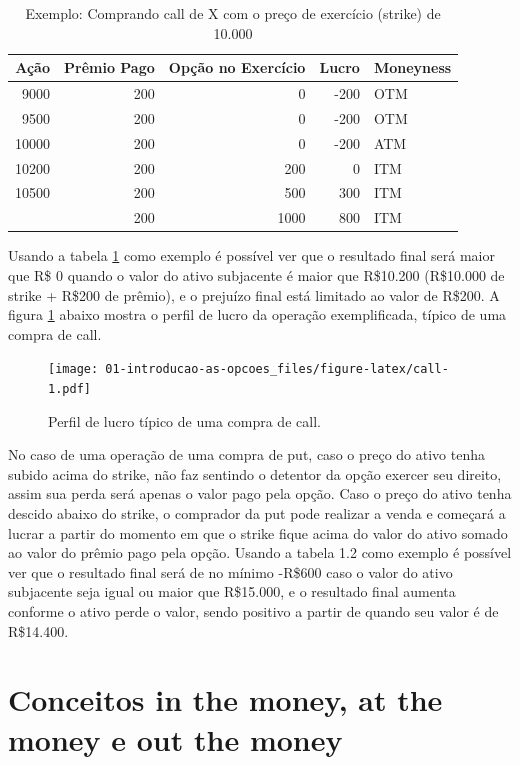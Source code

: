 \documentclass[]{book}
\theoremstyle{definition}
\theoremstyle{definition}
\theoremstyle{definition}
\theoremstyle{remark}
\begin{document}
\begin{table}[t]

\caption{\label{tab:opcao}Exemplo: Comprando call de X com o preço de exercício (strike) de 10.000}
\centering
\begin{tabular}{rrrrl}
\toprule
Ação & Prêmio Pago & Opção no Exercício & Lucro & Moneyness\\
\midrule
9000 & 200 & 0 & -200 & OTM\\
9500 & 200 & 0 & -200 & OTM\\
10000 & 200 & 0 & -200 & ATM\\
10200 & 200 & 200 & 0 & ITM\\
10500 & 200 & 500 & 300 & ITM\\
\addlinespace
11000 & 200 & 1000 & 800 & ITM\\
\bottomrule
\end{tabular}
\end{table}

Usando a tabela \ref{tab:opcao} como exemplo é possível ver que o resultado final será maior que R\$ 0 quando o valor do ativo subjacente é maior que R\$10.200 (R\$10.000 de strike + R\$200 de prêmio), e o prejuízo final está limitado ao valor de R\$200. A figura \ref{fig:call} abaixo mostra o perfil de lucro da operação exemplificada, típico de uma compra de call.

\begin{figure}
\centering
\texttt{[image: 01-introducao-as-opcoes\_files/figure-latex/call-1.pdf]}
\caption{\label{fig:call}Perfil de lucro típico de uma compra de call.}
\end{figure}

No caso de uma operação de uma compra de put, caso o preço do ativo tenha subido acima do strike, não faz sentindo o detentor da opção exercer seu direito, assim sua perda será apenas o valor pago pela opção. Caso o preço do ativo tenha descido abaixo do strike, o comprador da put pode realizar a venda e começará a lucrar a partir do momento em que o strike fique acima do valor do ativo somado ao valor do prêmio pago pela opção. Usando a tabela 1.2 como exemplo é possível ver que o resultado final será de no mínimo -R\$600 caso o valor do ativo subjacente seja igual ou maior que R\$15.000, e o resultado final aumenta conforme o ativo perde o valor, sendo positivo a partir de quando seu valor é de R\$14.400.

\hypertarget{conceitos-in-the-money-at-the-money-e-out-the-money}{%
\section{Conceitos in the money, at the money e out the money}\label{conceitos-in-the-money-at-the-money-e-out-the-money}}
\end{document}
